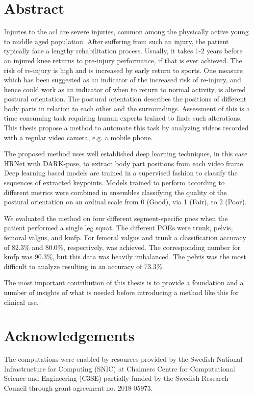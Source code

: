 \tableofcontents
\chapter*{Abstract}
Injuries to the \gls{acl} are severe injuries, common among the physically active young to middle aged population. After suffering from such an injury, the patient typically face a lengthy rehabilitation process. Usually, it takes 1-2 years before an injured knee returns to pre-injury performance, if that is ever achieved. The risk of re-injury is high and is increased by early return to sports. One measure which has been suggested as an indicator of the increased risk of re-injury, and hence could work as an indicator of when to return to normal activity, is altered postural orientation. The postural orientation describes the positions of different body parts in relation to each other and the surroundings. Assessment of this is a time consuming task requiring human experts trained to finds such alterations. This thesis propose a method to automate this task by analyzing videos recorded with a regular video camera, e.g. a mobile phone.

The proposed method uses well established deep learning techniques, in this case HRNet with DARK-pose, to extract body part positions from each video frame. Deep learning based models are trained in a supervised fashion to classify the sequences of extracted keypoints. Models trained to perform according to different metrics were combined in ensembles classifying the quality of the postural orientation on an ordinal scale from 0 (Good), via 1 (Fair), to 2 (Poor).

We evaluated the method on four different segment-specific \glspl{poe} when the patient performed a single leg squat. The different POEs were trunk, pelvis, femoral valgus, and \gls{kmfp}. For femoral valgus and trunk a classification accuracy of 82.3\% and 80.0\%, respectively, was achieved. The corresponding number for \gls{kmfp} was 90.3\%, but this data was heavily imbalanced. The pelvis was the most difficult to analyze resulting in an accuracy of 73.3\%.

The most important contribution of this thesis is to provide a foundation and a number of insights of what is needed before introducing a method like this for clinical use.

\chapter*{Acknowledgements}
The computations were enabled by resources provided by the Swedish National Infrastructure for Computing (SNIC) at Chalmers Centre for Computational Science and Engineering (C3SE) partially funded by the Swedish Research Council through grant agreement no. 2018-05973.

